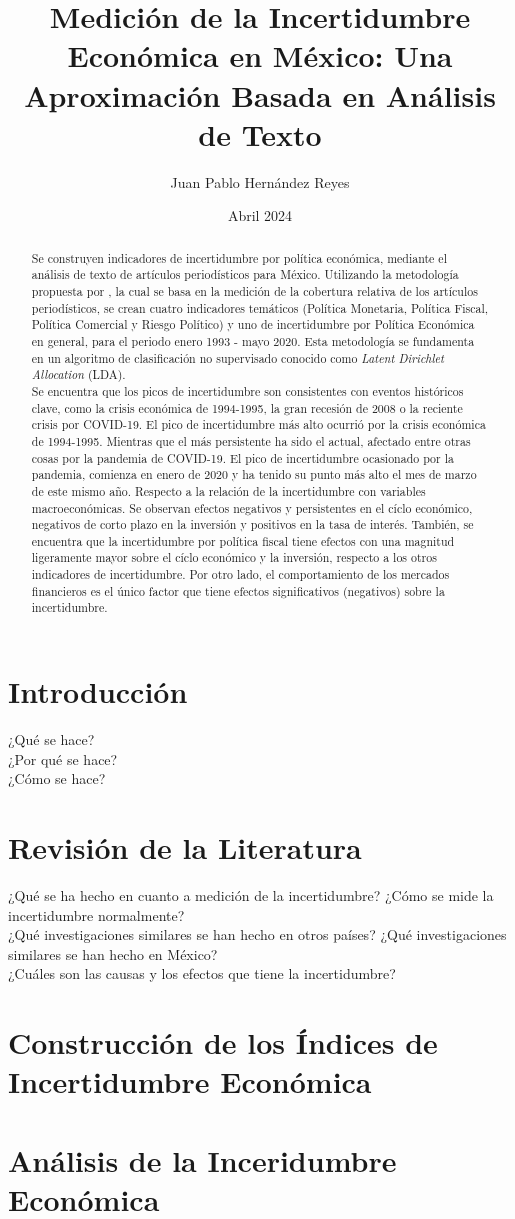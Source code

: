 \documentclass[11pt,a4paper]{article}
\title{Medición de la Incertidumbre Económica en México: Una Aproximación Basada en Análisis de Texto}
\date{Abril 2024}
\author{Juan Pablo Hernández Reyes}
\begin{document}
\maketitle

\begin{abstract}
Se construyen indicadores de incertidumbre por política económica, mediante el análisis de texto de artículos periodísticos para México. 
Utilizando la metodología propuesta por \cite{azqueta_2017}, la cual se basa en la medición de la cobertura relativa de los artículos periodísticos, se crean cuatro indicadores temáticos (Política Monetaria, Política Fiscal, Política Comercial y Riesgo Político) y uno de incertidumbre por Política Económica en general, para el periodo enero 1993 - mayo 2020. 
Esta metodología se fundamenta en un algoritmo de clasificación no supervisado conocido como \textit{Latent Dirichlet Allocation} (LDA). \\

Se encuentra que los picos de incertidumbre son consistentes con eventos históricos clave, como la crisis económica de 1994-1995, la gran recesión de 2008 o la reciente crisis por COVID-19. 
El pico de incertidumbre más alto ocurrió por la crisis económica de 1994-1995. Mientras que el más persistente ha sido el actual, afectado entre otras cosas por la pandemia de COVID-19. El pico de incertidumbre ocasionado por la pandemia, comienza en enero de 2020 y ha tenido su punto más alto el mes de marzo de este mismo año. 
Respecto a la relación de la incertidumbre con variables macroeconómicas. Se observan efectos negativos y persistentes en el cíclo económico, negativos de corto plazo en la inversión y positivos en la tasa de interés. 
También, se encuentra que la incertidumbre por política fiscal tiene efectos con una magnitud ligeramente mayor sobre el cíclo económico y la inversión, respecto a los otros indicadores de incertidumbre.  Por otro lado, el comportamiento de los mercados financieros es el único factor que tiene efectos significativos (negativos) sobre la incertidumbre.
\end{abstract}

\section{Introducción}
¿Qué se hace? \\
¿Por qué se hace? \\
¿Cómo se hace?

\section{Revisión de la Literatura}
¿Qué se ha hecho en cuanto a medición de la incertidumbre? ¿Cómo se mide la incertidumbre normalmente? \\
¿Qué investigaciones similares se han hecho en otros países?
¿Qué investigaciones similares se han hecho en México? \\
¿Cuáles son las causas y los efectos que tiene la incertidumbre?

\section{Construcción de los Índices de Incertidumbre Económica}

\section{Análisis de la Inceridumbre Económica}
\end{document}
